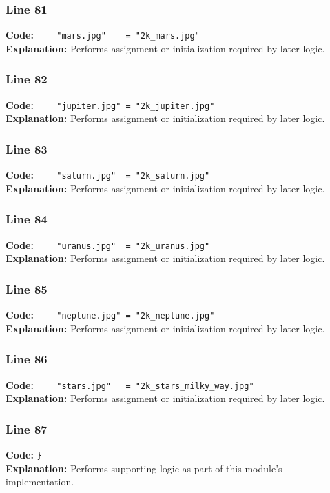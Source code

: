 \documentclass[11pt,a4paper]{article}
\begin{document}
\subsubsection*{Line 81}
\textbf{Code:} \verb|    "mars.jpg"    = "2k_mars.jpg"|\\
\textbf{Explanation:} Performs assignment or initialization required by later logic.

\subsubsection*{Line 82}
\textbf{Code:} \verb|    "jupiter.jpg" = "2k_jupiter.jpg"|\\
\textbf{Explanation:} Performs assignment or initialization required by later logic.

\subsubsection*{Line 83}
\textbf{Code:} \verb|    "saturn.jpg"  = "2k_saturn.jpg"|\\
\textbf{Explanation:} Performs assignment or initialization required by later logic.

\subsubsection*{Line 84}
\textbf{Code:} \verb|    "uranus.jpg"  = "2k_uranus.jpg"|\\
\textbf{Explanation:} Performs assignment or initialization required by later logic.

\subsubsection*{Line 85}
\textbf{Code:} \verb|    "neptune.jpg" = "2k_neptune.jpg"|\\
\textbf{Explanation:} Performs assignment or initialization required by later logic.

\subsubsection*{Line 86}
\textbf{Code:} \verb|    "stars.jpg"   = "2k_stars_milky_way.jpg"|\\
\textbf{Explanation:} Performs assignment or initialization required by later logic.

\subsubsection*{Line 87}
\textbf{Code:} \verb|}|\\
\textbf{Explanation:} Performs supporting logic as part of this module's implementation.
\end{document}
